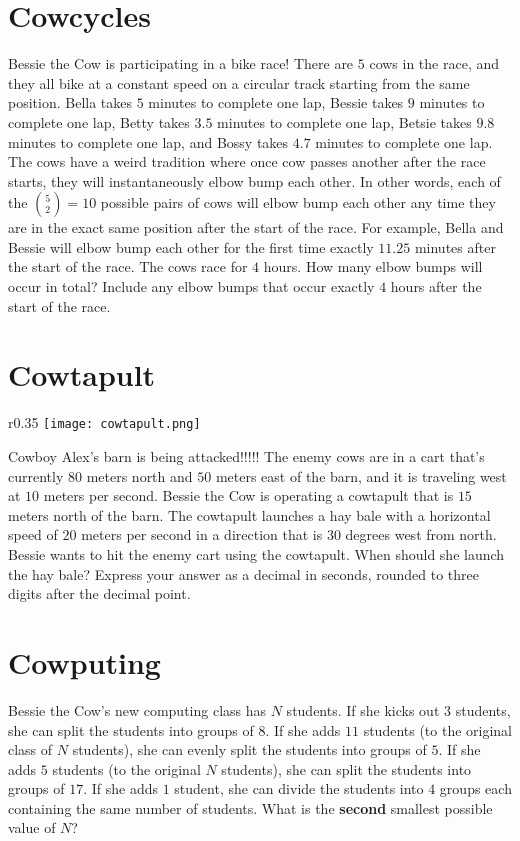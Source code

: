 \documentclass{article}
\begin{document}
\section*{Cowcycles}
Bessie the Cow is participating in a bike race!
There are $5$ cows in the race, and they all bike at a constant speed on a circular track starting from the same position.
Bella takes $5$ minutes to complete one lap, Bessie takes $9$ minutes to complete one lap, Betty takes $3.5$ minutes to complete one lap, Betsie takes $9.8$ minutes to complete one lap, and Bossy takes $4.7$ minutes to complete one lap.
The cows have a weird tradition where once cow passes another after the race starts, they will instantaneously elbow bump each other.
In other words, each of the ${5 \choose 2} = 10$ possible pairs of cows will elbow bump each other any time they are in the exact same position after the start of the race.
For example, Bella and Bessie will elbow bump each other for the first time exactly $11.25$ minutes after the start of the race.
The cows race for $4$ hours.
How many elbow bumps will  occur in total?
Include any elbow bumps that occur exactly $4$ hours after the start of the race.

\section*{Cowtapult}
\begin{wrapfigure}{r}{0.35\linewidth}
    \vspace{-20pt}
    \centering
    \texttt{[image: cowtapult.png]}
    \vspace{-20pt}
\end{wrapfigure}
Cowboy Alex's barn is being attacked!!!!!
The enemy cows are in a cart that's currently $80$ meters north and $50$ meters east of the barn, and it is traveling west at $10$ meters per second.
Bessie the Cow is operating a cowtapult that is $15$ meters north of the barn.
The cowtapult launches a hay bale with a horizontal speed of $20$ meters per second in a direction that is $30$ degrees west from north.
Bessie wants to hit the enemy cart using the cowtapult.
When should she launch the hay bale?
Express your answer as a decimal in seconds, rounded to three digits after the decimal point.

\section*{Cowputing}
Bessie the Cow's new computing class has $N$ students.
If she kicks out $3$ students, she can split the students into groups of $8$.
If she adds $11$ students (to the original class of $N$ students), she can evenly split the students into groups of $5$.
If she adds $5$ students (to the original $N$ students), she can split the students into groups of $17$.
If she adds $1$ student, she can divide the students into $4$ groups each containing the same number of students.
What is the \textbf{second} smallest possible value of $N$?
\end{document}
